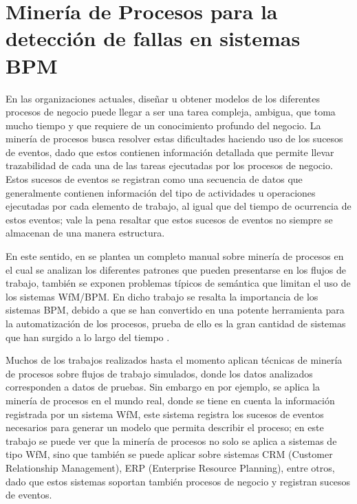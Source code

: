 \section{Minería de Procesos para la detección de fallas en sistemas BPM} %
\label{section1.3}

En las organizaciones actuales, diseñar u obtener modelos de los diferentes procesos de negocio puede llegar a ser una tarea compleja, ambigua, que toma mucho tiempo y que requiere de un conocimiento profundo del negocio. La minería de procesos busca resolver estas dificultades haciendo uso de los sucesos de eventos, dado que estos contienen información detallada que permite llevar trazabilidad de cada una de las tareas ejecutadas por los procesos de negocio. Estos sucesos de eventos se registran como una secuencia de datos que generalmente contienen información del tipo de actividades u operaciones ejecutadas por cada elemento de trabajo, al igual que del tiempo de ocurrencia de estos eventos; vale la pena resaltar que estos sucesos de eventos no siempre se almacenan de una manera estructura.

En este sentido, en \cite{VanderAalst2004} se plantea un completo manual sobre minería de procesos en el cual se analizan los diferentes patrones que pueden presentarse en los flujos de trabajo, también se exponen problemas típicos de semántica que limitan el uso de los sistemas WfM/BPM. En dicho trabajo se resalta la importancia de los sistemas BPM, debido a que se han convertido en una potente herramienta para la automatización de los procesos, prueba de ello es la gran cantidad de sistemas que han surgido a lo largo del tiempo \cite{VanderAalst2004}.

Muchos de los trabajos realizados hasta el momento aplican técnicas de minería de procesos sobre flujos de trabajo simulados, donde los datos analizados corresponden a datos de pruebas. Sin embargo en \cite{VanderAalst2007} por ejemplo, se aplica la minería de procesos en el mundo real, donde se tiene en cuenta la información registrada por un sistema WfM, este sistema registra los sucesos de eventos necesarios para generar un modelo que permita describir el proceso; en este trabajo se puede ver que la minería de procesos no solo se aplica a sistemas de tipo WfM, sino que también se puede aplicar sobre sistemas CRM (Customer Relationship Management), ERP (Enterprise Resource Planning), entre otros, dado que estos sistemas soportan también procesos de negocio y registran sucesos de eventos.


